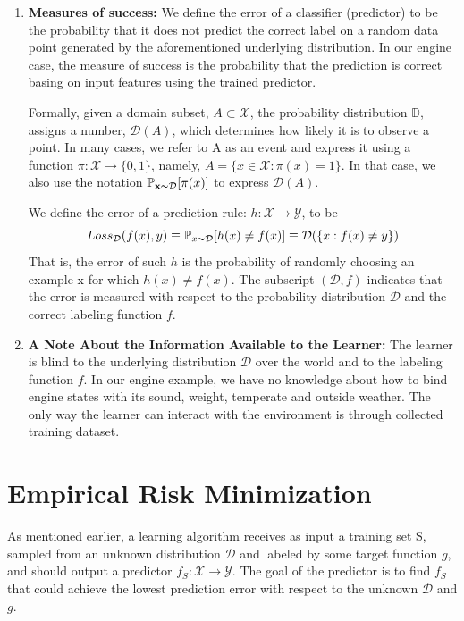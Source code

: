 \documentclass{article}[12pt]
\def\x{\mathbf{x}}
\begin{document}
\begin{enumerate}
    \item \textbf{Measures of success:} We define the error of a classifier (predictor) to be the probability that it does not predict the correct label on a random data point generated by the aforementioned underlying distribution. In our engine case, the measure of success is the probability that the prediction is correct basing on input features using the trained predictor.
    
    Formally, given a domain subset, $A \subset \mathcal{X}$, the probability distribution $\mathbb{D}$, assigns a number, $\mathcal{D}(A)$, which determines how likely it is to observe a point. In many cases, we refer to A as an event and express it using a function $\pi: \mathcal{X} \rightarrow \{0,1\}$, namely, $A=\{x \in \mathcal{X}: \pi(x)=1\}$. In that case, we also use the notation $\mathbb{P}_{\x \thicksim \mathcal{D}}[\pi(x)]$ to express $\mathcal{D}(A)$.
    
    We define the error of a prediction rule: $h: \mathcal{X} \rightarrow \mathcal{Y}$, to be
    \begin{equation}
        Loss_{\mathcal{D}}(f(x),y) \equiv \mathbb{P}_{x \thicksim \mathcal{D}}[h(x)\neq f(x)] \equiv \mathcal{D}(\{x: f(x)\neq y\})
    \end{equation}
    That is, the error of such $h$ is the probability of randomly choosing an example x for which $h(x)\neq f(x)$. The subscript $(\mathcal{D},f)$ indicates that the error is measured with respect to the probability distribution $\mathcal{D}$ and the correct labeling function $f$.
    \item \textbf{A Note About the Information Available to the Learner:} The learner is blind to the underlying distribution $\mathcal{D}$ over the world and to the labeling function $f$. In our engine example, we have no knowledge about how to bind engine states with its sound, weight, temperate and outside weather. The only way the learner can interact with the environment is through collected training dataset.
\end{enumerate}

\section{Empirical Risk Minimization}
As mentioned earlier, a learning algorithm receives as input a training set S, sampled from an unknown distribution $\mathcal{D}$ and labeled by some target function $g$, and should output a predictor $f_S: \mathcal{X} \rightarrow \mathcal{Y}$. The goal of the predictor is to find $f_S$ that could achieve the lowest prediction error with respect to the unknown $\mathcal{D}$ and $g$.
\end{document}
